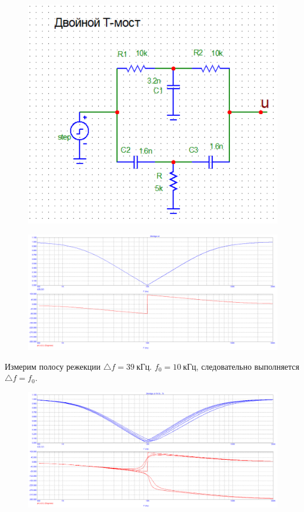 \documentclass[a4paper, 12pt]{article}%
\begin{document}
\begin{enumerate}
\begin{figure}[h!]
\centering
\includegraphics[scale=0.4]{2tbridge_img.png}
\label{fig:Image1}
\end{figure}

\begin{figure}[h!]
\centering
\includegraphics[scale=0.4]{2tbridge.png}
\label{fig:Image1}
\end{figure}

Измерим полосу режекции $\triangle f = 39 \: \textit{кГц}$. $f_0 = 10 \: \textit{кГц}$, следовательно выполняется $\triangle f = f_0$.

\begin{figure}[h!]
\centering
\includegraphics[scale=0.4]{2tbridge_AC2.png}
\label{fig:Image1}
\end{figure}


\end{enumerate}
\end{document}
